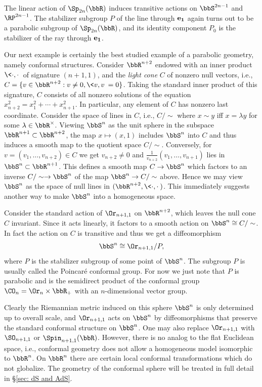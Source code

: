 \begin{defn}
    The linear action of $\Sp_{2n}(\bbR)$ induces transitive actions on $\bbS^{2n-1}$ and $\RP^{2n-1}$. The stabilizer subgroup $P$ of the line through $\bf{e}_1$ again turns out to be a parabolic subgroup of $\Sp_{2n}(\bbR)$, and its identity component $P_0$ is the stabilizer of the ray through $\bf{e}_1$.
\end{defn}


Our next example is certainly the best studied example of a parabolic geometry, namely conformal structures. Consider $\bbR^{n+2}$ endowed with an inner product $\<\cdot,\cdot\>$ of signature $(n+1,1)$, and the \emph{light cone} $C$ of nonzero null vectors, i.e., $C=\{v\in\bbR^{n+2}:v\neq 0,\<v,v\>=0\}$. Taking the standard inner product of this signature, $C$ consists of all nonzero solutions of the equation $x_{n+2}^2=x_1^2+\cdots +x_{n+1}^2$. In particular, any element of $C$ has nonzero last coordinate. Consider the space of lines in $C$, i.e., $C\slash \sim$ where $x\sim y$ iff $x=\lambda y$ for some $\lambda \in \bbR^\times$. Viewing $\bbS^n$ as the unit sphere in the subspace $\bbR^{n+1}\subset \bbR^{n+2}$, the map $x\mapsto (x,1)$ includes $\bbS^n$ into $C$ and thus induces a smooth map to the quotient space $C\slash \sim$. Conversely, for $v=(v_1,\ldots,v_{n+2})\in C$ we get $v_{n+2}\neq 0$ and $\frac{1}{v_{n+2}}(v_1,\ldots,v_{n+1})$ lies in $\bbS^n\subset \bbR^{n+1}$. This defines a smooth map $C\to \bbS^n$ which factors to an inverse $C\slash \sim\to \bbS^n$ of the map $\bbS^n\to C\slash \sim$ above. Hence we may view $\bbS^n$ as the space of null lines in $(\bbR^{n+2},\<\cdot,\cdot\>)$. This immediately suggests another way to make $\bbS^n$ into a homogeneous space.

\begin{defn}
    Consider the standard action of $\Or_{n+1,1}$ on $\bbR^{n+2}$, which leaves the null cone $C$ invariant. Since it acts linearly, it factors to a smooth action on $\bbS^n\cong C\slash \sim$. In fact the action on $C$ is transitive and thus we get a diffeomorphism
    \[\bbS^n\cong \Or_{n+1,1}\slash P,\]
    where $P$ is the stabilizer subgroup of some point of $\bbS^n$. The subgroup $P$ is usually called the Poincar\'e conformal group. For now we just note that $P$ is parabolic and is the semidirect product of the conformal group $\CO_n=\Or_n\times\bbR_+$ with an $n$-dimensional vector group.
\end{defn}

Clearly the Riemannian metric induced on this sphere $\bbS^n$ is only determined up to overall scale, and $\Or_{n+1,1}$ acts on $\bbS^n$ by diffeomorphisms that preserve the standard conformal structure on $\bbS^n$. One may also replace $\Or_{n+1,1}$ with $\SO_{n+1,1}$ or $\Spin_{n+1,1}(\bbR)$. However, there is no analog to the flat Euclidean space, i.e., conformal geometry does not allow a homogeneous model isomorphic to $\bbR^n$. On $\bbR^n$ there are certain local conformal transformations which do not globalize. The geometry of the conformal sphere will be treated in full detail in \S\ref{sec: dS and AdS}.

